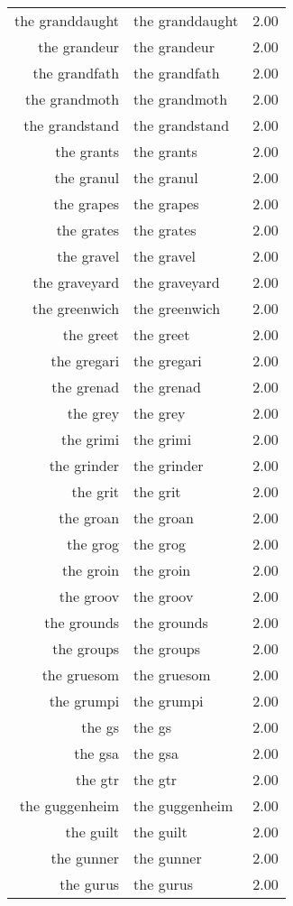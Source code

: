 \begin{table}[ht]
\begin{tabular}{rlr}
  the granddaught & the granddaught & 2.00 \\ 
  the grandeur & the grandeur & 2.00 \\ 
  the grandfath & the grandfath & 2.00 \\ 
  the grandmoth & the grandmoth & 2.00 \\ 
  the grandstand & the grandstand & 2.00 \\ 
  the grants & the grants & 2.00 \\ 
  the granul & the granul & 2.00 \\ 
  the grapes & the grapes & 2.00 \\ 
  the grates & the grates & 2.00 \\ 
  the gravel & the gravel & 2.00 \\ 
  the graveyard & the graveyard & 2.00 \\ 
  the greenwich & the greenwich & 2.00 \\ 
  the greet & the greet & 2.00 \\ 
  the gregari & the gregari & 2.00 \\ 
  the grenad & the grenad & 2.00 \\ 
  the grey & the grey & 2.00 \\ 
  the grimi & the grimi & 2.00 \\ 
  the grinder & the grinder & 2.00 \\ 
  the grit & the grit & 2.00 \\ 
  the groan & the groan & 2.00 \\ 
  the grog & the grog & 2.00 \\ 
  the groin & the groin & 2.00 \\ 
  the groov & the groov & 2.00 \\ 
  the grounds & the grounds & 2.00 \\ 
  the groups & the groups & 2.00 \\ 
  the gruesom & the gruesom & 2.00 \\ 
  the grumpi & the grumpi & 2.00 \\ 
  the gs & the gs & 2.00 \\ 
  the gsa & the gsa & 2.00 \\ 
  the gtr & the gtr & 2.00 \\ 
  the guggenheim & the guggenheim & 2.00 \\ 
  the guilt & the guilt & 2.00 \\ 
  the gunner & the gunner & 2.00 \\ 
  the gurus & the gurus & 2.00 \\ 

\end{tabular}
\end{table}
